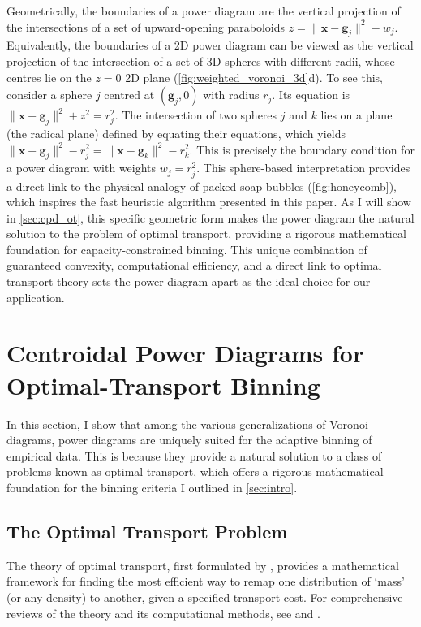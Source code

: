 \documentclass[fleqn,usenatbib]{mnras}
\newcommand{\norm}[1]{\lVert#1\rVert}
\begin{document}
Geometrically, the boundaries of a power diagram are the vertical projection of the intersections of a set of upward-opening paraboloids $z = \norm{\mathbf{x} - \mathbf{g}_j}^2 - w_j$. Equivalently, the boundaries of a 2D power diagram can be viewed as the vertical projection of the intersection of a set of 3D spheres with different radii, whose centres lie on the $z=0$ 2D plane (\autoref{fig:weighted_voronoi_3d}d). To see this, consider a sphere $j$ centred at $(\mathbf{g}_j, 0)$ with radius $r_j$. Its equation is $\norm{\mathbf{x} - \mathbf{g}_j}^2 + z^2 = r_j^2$. The intersection of two spheres $j$ and $k$ lies on a plane (the radical plane) defined by equating their equations, which yields $\norm{\mathbf{x} - \mathbf{g}_j}^2 - r_j^2 = \norm{\mathbf{x} - \mathbf{g}_k}^2 - r_k^2$. This is precisely the boundary condition for a power diagram with weights $w_j = r_j^2$. This sphere-based interpretation provides a direct link to the physical analogy of packed soap bubbles (\autoref{fig:honeycomb}), which inspires the fast heuristic algorithm presented in this paper. As I will show in \autoref{sec:cpd_ot}, this specific geometric form makes the power diagram the natural solution to the problem of optimal transport, providing a rigorous mathematical foundation for capacity-constrained binning. This unique combination of guaranteed convexity, computational efficiency, and a direct link to optimal transport theory sets the power diagram apart as the ideal choice for our application.

\section{Centroidal Power Diagrams for Optimal-Transport Binning}
\label{sec:cpd_ot}

In this section, I show that among the various generalizations of Voronoi diagrams, power diagrams are uniquely suited for the adaptive binning of empirical data. This is because they provide a natural solution to a class of problems known as optimal transport, which offers a rigorous mathematical foundation for the binning criteria I outlined in \autoref{sec:intro}.

\subsection{The Optimal Transport Problem}

The theory of optimal transport, first formulated by \citet{Monge1781}, provides a mathematical framework for finding the most efficient way to remap one distribution of `mass' (or any density) to another, given a specified transport cost. For comprehensive reviews of the theory and its computational methods, see \citet{Levy2018} and \citet{Peyre2019}.
\end{document}
